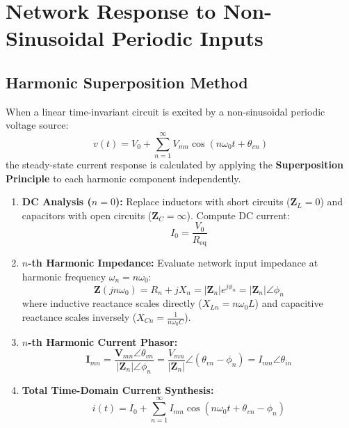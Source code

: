 \documentclass[12pt,a4paper]{article}
\begin{document}
\section{Network Response to Non-Sinusoidal Periodic Inputs}

\subsection{Harmonic Superposition Method}
When a linear time-invariant circuit is excited by a non-sinusoidal periodic voltage source:
\begin{equation}
  v(t) = V_0 + \sum_{n=1}^\infty V_{mn} \cos(n\omega_0 t + \theta_{vn})
\end{equation}
the steady-state current response is calculated by applying the \textbf{Superposition Principle} to each harmonic component independently.

\begin{tcolorbox}[formulabox, title={\textbf{Systematic Harmonic Solution Procedure}}]
\begin{enumerate}[leftmargin=*, itemsep=2pt, topsep=1pt]
  \item \textbf{DC Analysis ($n=0$):} Replace inductors with short circuits ($\mathbf{Z}_L = 0$) and capacitors with open circuits ($\mathbf{Z}_C = \infty$). Compute DC current:
  \begin{equation}
    I_0 = \frac{V_0}{R_{\text{eq}}}
  \end{equation}
  \item \textbf{$n$-th Harmonic Impedance:} Evaluate network input impedance at harmonic frequency $\omega_n = n\omega_0$:
  \begin{equation}
    \mathbf{Z}(j n \omega_0) = R_n + j X_n = |\mathbf{Z}_n| e^{j \phi_n} = |\mathbf{Z}_n| \angle \phi_n
  \end{equation}
  where inductive reactance scales directly ($X_{Ln} = n\omega_0 L$) and capacitive reactance scales inversely ($X_{Cn} = \frac{1}{n\omega_0 C}$).
  \item \textbf{$n$-th Harmonic Current Phasor:}
  \begin{equation}
    \mathbf{I}_{mn} = \frac{\mathbf{V}_{mn} \angle \theta_{vn}}{|\mathbf{Z}_n| \angle \phi_n} = \frac{V_{mn}}{|\mathbf{Z}_n|} \angle (\theta_{vn} - \phi_n) = I_{mn} \angle \theta_{in}
  \end{equation}
  \item \textbf{Total Time-Domain Current Synthesis:}
  \begin{equation}
    i(t) = I_0 + \sum_{n=1}^\infty I_{mn} \cos(n\omega_0 t + \theta_{vn} - \phi_n)
  \end{equation}
\end{enumerate}
\end{tcolorbox}
\end{document}
